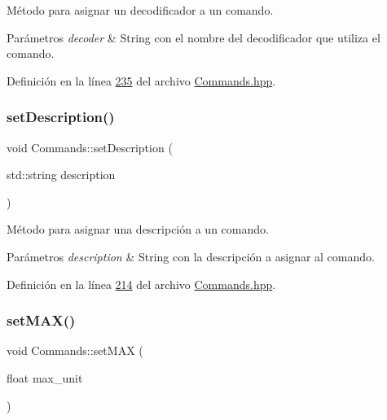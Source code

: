 Método para asignar un decodificador a un comando. 


\begin{DoxyParams}{Parámetros}
{\em decoder} & String con el nombre del decodificador que utiliza el comando. \\
\hline
\end{DoxyParams}


Definición en la línea \hyperlink{Commands_8hpp_source_l00235}{235} del archivo \hyperlink{Commands_8hpp_source}{Commands.\+hpp}.

\mbox{\label{classCommands_aa430824877071f732b1a9aa9ff1bbf94}} 
\subsubsection{\texorpdfstring{set\+Description()}{setDescription()}}
{\footnotesize\ttfamily void Commands\+::set\+Description (\begin{DoxyParamCaption}\item[{std\+::string}]{description }\end{DoxyParamCaption})\hspace{0.3cm}{\ttfamily [inline]}}



Método para asignar una descripción a un comando. 


\begin{DoxyParams}{Parámetros}
{\em description} & String con la descripción a asignar al comando. \\
\hline
\end{DoxyParams}


Definición en la línea \hyperlink{Commands_8hpp_source_l00214}{214} del archivo \hyperlink{Commands_8hpp_source}{Commands.\+hpp}.

\mbox{\label{classCommands_a364530a20f17fb20420c5980b1b07ea2}} 
\subsubsection{\texorpdfstring{set\+M\+A\+X()}{setMAX()}}
{\footnotesize\ttfamily void Commands\+::set\+M\+AX (\begin{DoxyParamCaption}\item[{float}]{max\+\_\+unit }\end{DoxyParamCaption})\hspace{0.3cm}{\ttfamily [inline]}}



